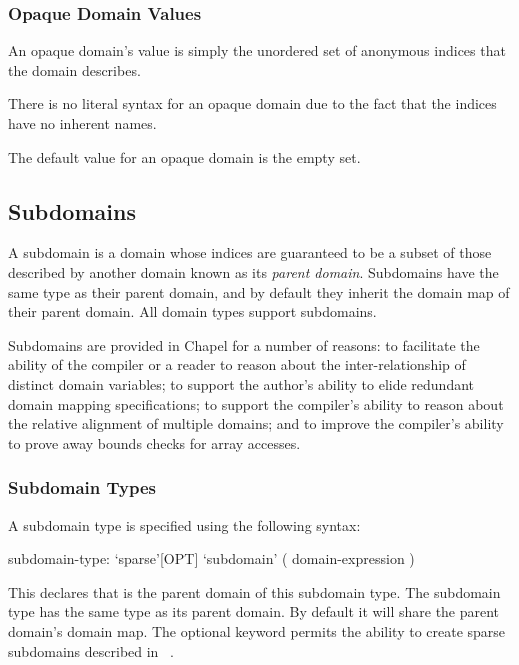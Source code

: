\subsubsection{Opaque Domain Values}
\label{Opaque_Domain_Values}

An opaque domain's value is simply the unordered set of anonymous
indices that the domain describes.


There is no literal syntax for an opaque domain due to the fact that
the indices have no inherent names.


The default value for an opaque domain is the empty set.


\subsection{Subdomains}
\label{Subdomains}

A subdomain is a domain whose indices are guaranteed to be a subset of
those described by another domain known as its \emph{parent domain}.
Subdomains have the same type as their parent domain, and by default
they inherit the domain map of their parent domain.  All domain types
support subdomains.

\begin{rationale}
Subdomains are provided in Chapel for a number of reasons: to
facilitate the ability of the compiler or a reader to reason about the
inter-relationship of distinct domain variables; to support the
author's ability to elide redundant domain mapping specifications; to
support the compiler's ability to reason about the relative alignment
of multiple domains; and to improve the compiler's ability to prove
away bounds checks for array accesses.
\end{rationale}

\subsubsection{Subdomain Types}
\label{Subdomain_Types}

A subdomain type is specified using the following syntax:
\begin{syntax}
subdomain-type:
  `sparse'[OPT] `subdomain' ( domain-expression )
\end{syntax}
This declares that  is the parent domain of
this subdomain type.  The subdomain type has the same type as its
parent domain.  By default it will share the parent domain's domain
map.  The optional  keyword permits the ability to
create sparse subdomains described in ~.

